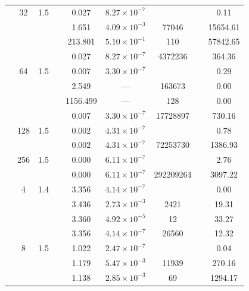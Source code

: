 \begin{table}[htbp]
\begin{tabular}{l S[table-format=3.0] S[table-format=4.1] l S[table-format=3.3] S[table-format=1.2e2] S[table-format=6.0] S[table-format=2.0] S[table-format=4.2]}
     & 32 & 1.5 &  & 0.027 & $8.27 \times 10^{-7}$ & {\text{---}} & {\text{---}} & 0.11 \\
     &  &  &  & 1.651 & $4.09 \times 10^{-3}$ & 77046 & {\text{---}} & 15654.61 \\
     &  &  &  & 213.801 & $5.10 \times 10^{-1}$ & 110 & {\text{---}} & 57842.65 \\
     &  &  &  & 0.027 & $8.27 \times 10^{-7}$ & 4372236 & {\text{---}} & 364.36 \\
     & 64 & 1.5 &  & 0.007 & $3.30 \times 10^{-7}$ & {\text{---}} & {\text{---}} & 0.29 \\
     &  &  &  & 2.549 & ${\text{---}}$ & 163673 & {\text{---}} & 0.00 \\
     &  &  &  & 1156.499 & ${\text{---}}$ & 128 & {\text{---}} & 0.00 \\
     &  &  &  & 0.007 & $3.30 \times 10^{-7}$ & 17728897 & {\text{---}} & 730.16 \\
     & 128 & 1.5 &  & 0.002 & $4.31 \times 10^{-7}$ & {\text{---}} & {\text{---}} & 0.78 \\
     &  &  &  & 0.002 & $4.31 \times 10^{-7}$ & 72253730 & {\text{---}} & 1386.93 \\
     & 256 & 1.5 &  & 0.000 & $6.11 \times 10^{-7}$ & {\text{---}} & {\text{---}} & 2.76 \\
     &  &  &  & 0.000 & $6.11 \times 10^{-7}$ & 292209264 & {\text{---}} & 3097.22 \\
    \midrule
     & 4 & 1.4 &  & 3.356 & $4.14 \times 10^{-7}$ & {\text{---}} & {\text{---}} & 0.00 \\
     &  &  &  & 3.436 & $2.73 \times 10^{-3}$ & 2421 & {\text{---}} & 19.31 \\
     &  &  &  & 3.360 & $4.92 \times 10^{-5}$ & 12 & {\text{---}} & 33.27 \\
     &  &  &  & 3.356 & $4.14 \times 10^{-7}$ & 26560 & {\text{---}} & 12.32 \\
     & 8 & 1.5 &  & 1.022 & $2.47 \times 10^{-7}$ & {\text{---}} & {\text{---}} & 0.04 \\
     &  &  &  & 1.179 & $5.47 \times 10^{-3}$ & 11939 & {\text{---}} & 270.16 \\
     &  &  &  & 1.138 & $2.85 \times 10^{-3}$ & 69 & {\text{---}} & 1294.17 \\

\end{tabular}
\end{table}
